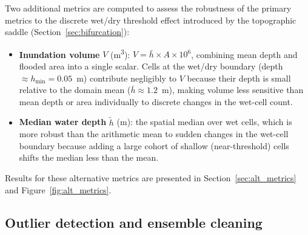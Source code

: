 \documentclass[review,12pt]{elsarticle}
\begin{document}
Two additional metrics are computed to assess the robustness of the primary
metrics to the discrete wet/dry threshold effect introduced by the topographic
saddle (Section~\ref{sec:bifurcation}):
\begin{itemize}
  \item \textbf{Inundation volume} $V$ (m\textsuperscript{3}):
        $V = \bar{h} \times A \times 10^6$, combining mean depth and flooded
        area into a single scalar.
        Cells at the wet/dry boundary (depth $\approx h_{\min} = 0.05$~m)
        contribute negligibly to $V$ because their depth is small relative to
        the domain mean ($\bar{h} \approx 1.2$~m), making volume less sensitive
        than mean depth or area individually to discrete changes in the wet-cell
        count.
  \item \textbf{Median water depth} $\tilde{h}$ (m): the spatial median over
        wet cells, which is more robust than the arithmetic mean to sudden
        changes in the wet-cell boundary because adding a large cohort of
        shallow (near-threshold) cells shifts the median less than the mean.
\end{itemize}
Results for these alternative metrics are presented in
Section~\ref{sec:alt_metrics} and Figure~\ref{fig:alt_metrics}.

\subsection{Outlier detection and ensemble cleaning}
\label{sec:cleaning}
\end{document}
